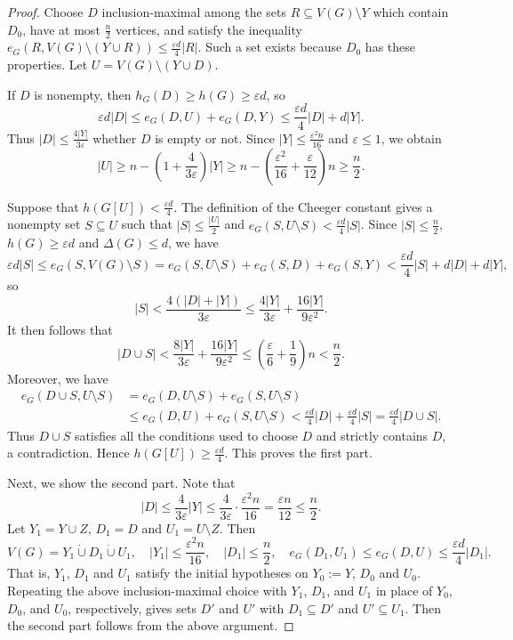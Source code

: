 \documentclass[11pt,a4paper]{article}
\theoremstyle{definition}
\theoremstyle{remark}
\newcommand{\eps}{\varepsilon}
\begin{document}
\begin{proof}
Choose $D$ inclusion-maximal among the sets
$R\subseteq V(G)\setminus Y$ which contain $D_0$, have at most
$\frac{n}{2}$ vertices, and satisfy
the inequality
$e_G(R,V(G)\setminus(Y\cup R))\le\frac{\eps d}{4}|R|$.
Such a set exists because $D_0$ has these properties. Let
$U=V(G)\setminus(Y\cup D)$.

If $D$ is nonempty, then $h_G(D)\ge h(G)\ge  \eps d$, so
\[
 \eps d|D|
 \le e_G(D,U)+e_G(D,Y)
 \le\frac{\eps d}{4}|D|+d|Y|.
\]
Thus  $|D|\le\frac{4|Y|}{3\eps}$ whether
$D$ is empty or not. Since $|Y|\le\frac{\eps^2n}{16}$ and
$\eps\le1$, we obtain
\[
 |U|\ge n-\left(1+\frac{4}{3\eps}\right)|Y|
 \ge n-\left(\frac{\eps^2}{16}+\frac{\eps}{12}\right)n
 \ge\frac{n}{2}.
\]

Suppose that $h(G[U])<\frac{\eps d}{4}$. The definition of the Cheeger
constant gives a nonempty set $S\subseteq U$ such that
$|S|\le\frac{|U|}{2}$ and
$e_G(S,U\setminus S)<\frac{\eps d}{4}|S|$. Since
$|S|\le\frac{n}{2}$, $h(G)\ge \eps  d$ and $\Delta(G)\le d$, we have
\[
 \eps d|S|
 \le e_G(S, V(G)\setminus S)=e_G(S,U\setminus S)+e_G(S,D)+e_G(S,Y)
 <\frac{\eps d}{4}|S|+d|D|+d|Y|,
\]
so 
\[
|S|<\frac{4(|D|+|Y|)}{3\eps}\le \frac{4|Y|}{3\eps}+\frac{16|Y|}{9\eps^2}.
\]
It then follows that
\[
 |D\cup S|
 <\frac{8|Y|}{3\eps}+\frac{16|Y|}{9\eps^2}
 \le\left(\frac{\eps}{6}+\frac{1}{9}\right)n
 <\frac{n}{2}.
\]
Moreover, we have
\[
 \begin{aligned}
 e_G(D\cup S,U\setminus S)
 &=e_G(D,U\setminus S)+e_G(S,U\setminus S)\\
 &\le e_G(D,U)+e_G(S,U\setminus S)<\frac{\eps d}{4}|D|+\frac{\eps d}{4}|S|=
\frac{\eps d}{4}|D\cup S|.
 \end{aligned}
\]
Thus $D\cup S$ satisfies all the conditions used to choose $D$ and
strictly contains $D$, a contradiction. Hence
$h(G[U])\ge\frac{\eps d}{4}$. This proves the first part. 

Next, we show  the second part.  Note that
\[
|D|\le \frac{4}{3\eps}|Y|\le \frac{4}{3\eps}\cdot \frac{\eps^2 n}{16}=\frac{\eps n}{12}\le \frac{n}{2}.
\]
Let $Y_1=Y\cup Z$, $D_1=D$ and $U_1=U\setminus Z$.  Then
\[
 V(G)=Y_1\mathbin{\dot\cup}D_1\mathbin{\dot\cup}U_1,
 \quad |Y_1|\le\frac{\eps^2n}{16},
 \quad |D_1|\le\frac{n}{2},
 \quad e_G(D_1,U_1)\le e_G(D,U)\le \frac{\eps d}{4}|D_1|.
\]
That is,  $Y_1$, $D_1$ and $U_1$ satisfy the  initial hypotheses
 on $Y_0:=Y$, $D_0$ and $U_0$.
Repeating the above inclusion-maximal choice with $Y_1$, $D_1$, and
$U_1$ in place of $Y_0$, $D_0$, and $U_0$, respectively, 
gives sets $D'$ and $U'$ with $D_1\subseteq D'$ and
$U'\subseteq U_1$. Then the second part follows from the above argument.
\end{proof}
\end{document}
